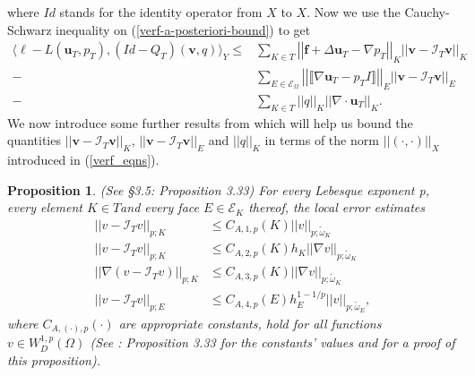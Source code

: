 \documentclass[12pt,a4paper]{article}
\newtheorem{proposition}[theorem]{Proposition}
\theoremstyle{definition}
\begin{document}
where $Id$ stands for the identity operator from $X$ to $X$.  Now we use the Cauchy-Schwarz inequality on (\ref{verf-a-posteriori-bound}) to get
\begin{equation}\label{verf-a-posteriori-bound-cs}
\begin{aligned}
\langle \ell -L\left(\textbf{u}_T,p_T\right),\left(Id-Q_T\right)\left(\textbf{v},q\right) \rangle_Y\leq
&\sum_{K\in T}\left|\left|\textbf{f}+\Delta \textbf{u}_T-\nabla p_T \right|\right|_K \left|\left|\textbf{v}-\mathcal{I}_T\textbf{v}\right|\right|_K\\
-&\sum_{E\in \mathcal{E}_{\Omega}}\left|\left|\llbracket\nabla \textbf{u}_T-p_TI\rrbracket \right|\right|_E \left|\left|\textbf{v}-\mathcal{I}_T\textbf{v}\right|\right|_E\\
-&\sum_{K\in T}\left|\left|q\right|\right|_K\left|\left|\nabla \cdot \textbf{u}_T\right|\right|_K.
\end{aligned}
\end{equation}
We now introduce some further results from \cite{verfurth2013posteriori} which will help us bound the quantities $\left|\left|\textbf{v}-\mathcal{I}_T\textbf{v}\right|\right|_K$, $\left|\left|\textbf{v}-\mathcal{I}_T\textbf{v}\right|\right|_E$ and $\left|\left|q\right|\right|_K$ in terms of the norm $\left|\left|\left(\cdot,\cdot\right)\right|\right|_X$ introduced in (\ref{verf_eqns}).
\begin{proposition}{(See \cite{verfurth2013posteriori} \S3.5: Proposition 3.33)} \label{verf_prop_bounds} For every Lebesque exponent p, every element $K\in T$and every face $E\in\mathcal{E}_K$ thereof, the local error estimates
\begin{equation}
\begin{aligned}
\left|\left|v-\mathcal{I}_Tv\right|\right|_{p;K}&\leq C_{A,1,p}\left(K\right)\left|\left|v\right|\right|_{p;\widetilde{\omega}_K}\\
\left|\left|v-\mathcal{I}_Tv\right|\right|_{p;K}&\leq C_{A,2,p}\left(K\right)h_K\left|\left|\nabla v\right|\right|_{p;\widetilde{\omega}_K}\\
\left|\left|\nabla\left(v-\mathcal{I}_Tv\right)\right|\right|_{p;K}&\leq C_{A,3,p}\left(K\right)\left|\left|\nabla v\right|\right|_{p;\widetilde{\omega}_K}\\
\left|\left|v-\mathcal{I}_Tv\right|\right|_{p;E}&\leq C_{A,4,p}\left(E\right)h_E^{1-1/p}\left|\left|v\right|\right|_{p;\widetilde{\omega}_E},
\end{aligned}
\end{equation}
where $C_{A,\left(\cdot\right),p}\left(\cdot\right)$ are appropriate constants, hold for all functions $v\in W^{1,p}_D\left(\Omega\right)$ (See \cite{verfurth2013posteriori}: Proposition 3.33 for the constants' values and for a proof of this proposition).
\end{proposition}
\end{document}
